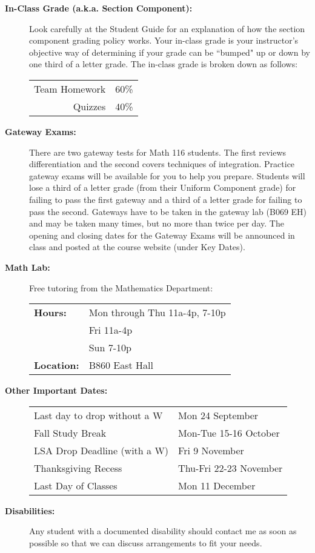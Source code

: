 \documentclass[11pt,twoside]{article}
\begin{document}
\begin{description}
\vspace{.1in}
\item[\bf In-Class Grade (a.k.a. Section Component):]  Look carefully at the Student Guide for an explanation of how the section component grading policy works.  Your in-class grade is your instructor's objective way of determining if your grade can be ``bumped" up or down by one third of a letter grade.  The in-class grade is broken down as follows:  

\begin{tabular}{rl}
 Team Homework & 60\% \\
 Quizzes & 40\% \\
\end{tabular}

\vspace{.1in}
\item[\bf Gateway Exams:]  There are two gateway tests for Math 116 students. The first reviews
differentiation and the second covers techniques of integration. Practice gateway exams will
be available for you to help you prepare. Students will lose a third of a letter grade (from their
Uniform Component grade) for failing to pass the first gateway and a third of a letter grade for
failing to pass the second. Gateways have to be taken in the gateway lab (B069 EH) and
may be taken many times, but no more than twice per day. The opening and closing dates
for the Gateway Exams will be announced in class and posted at the course website (under
Key Dates).

\vspace{.1in}
\item[\bf Math Lab:]  Free tutoring from the Mathematics Department:

\begin{tabular}{ll}
{\bf Hours:} & Mon through Thu 11a-4p, 7-10p \\
             & Fri 11a-4p \\
             & Sun 7-10p \\
{\bf Location:} & B860 East Hall
\end{tabular}

\vspace{.1in}
\item[\bf Other Important Dates:]
\begin{tabular}{ll}
Last day to drop without a W & Mon 24 September \\
Fall Study Break & Mon-Tue 15-16 October \\
LSA Drop Deadline (with a W) & Fri 9 November \\
Thanksgiving Recess & Thu-Fri 22-23 November \\
Last Day of Classes & Mon 11 December
\end{tabular}

\vspace{.4in}
\item[\bf Disabilities:]  Any student with a documented disability should contact me as soon as possible so that we can discuss arrangements to fit your needs.
\end{description}
\end{document}
